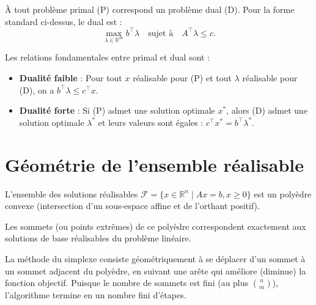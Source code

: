 À tout problème primal (P) correspond un problème dual (D). Pour la forme standard ci-dessus, le dual est :
\begin{equation}
    \max_{\lambda \in \mathbb{R}^m} b^\top \lambda \quad \text{sujet à} \quad A^\top \lambda \leq c.
\end{equation}

Les relations fondamentales entre primal et dual sont :
\begin{itemize}
    \item \textbf{Dualité faible} : Pour tout $x$ réalisable pour (P) et tout $\lambda$ réalisable pour (D), on a $b^\top \lambda \leq c^\top x$.
    \item \textbf{Dualité forte} : Si (P) admet une solution optimale $x^*$, alors (D) admet une solution optimale $\lambda^*$ et leurs valeurs sont égales : $c^\top x^* = b^\top \lambda^*$.
\end{itemize}

\section{Géométrie de l'ensemble réalisable}

L'ensemble des solutions réalisables $\mathcal{F} = \{ x \in \mathbb{R}^n \mid Ax = b, x \geq 0 \}$ est un polyèdre convexe (intersection d'un sous-espace affine et de l'orthant positif).

\begin{proposition}
    Les sommets (ou points extrêmes) de ce polyèdre correspondent exactement aux solutions de base réalisables du problème linéaire.
\end{proposition}

La méthode du simplexe consiste géométriquement à se déplacer d'un sommet à un sommet adjacent du polyèdre, en suivant une arête qui améliore (diminue) la fonction objectif.
Puisque le nombre de sommets est fini (au plus $\binom{n}{m}$), l'algorithme termine en un nombre fini d'étapes.

